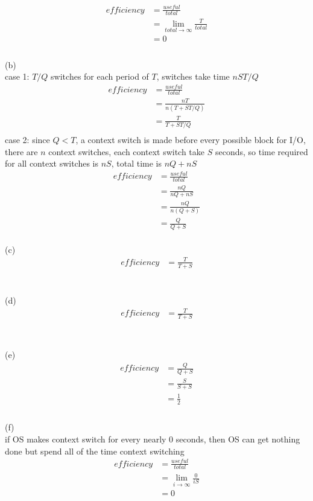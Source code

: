 \documentclass[12pt, border = 4pt, multi]{article} %
\begin{document}
\begin{align*}
efficiency &= \frac{useful}{total}\\
&= \lim_{total \rightarrow \infty} \frac{T}{total}\\
&= 0\\
\end{align*}
\\
(b)\\
case 1: $T / Q$ switches for each period of $T$, switches take time $nST / Q$
\begin{align*}
efficiency &= \frac{useful}{total}\\
&= \frac{nT}{n(T + ST / Q)}\\
&= \frac{T}{T + ST / Q}\\
\end{align*}
case 2: since $Q < T$, a context switch is made before every possible block for I/O, there are $n$ context switches, each context switch take $S$ seconds, so time required for all context switches is $nS$, total time is $nQ + nS$
\begin{align*}
efficiency &= \frac{useful}{total}\\
&= \frac{nQ}{nQ + nS}\\
&= \frac{nQ}{n(Q + S)}\\
&= \frac{Q}{Q + S}
\end{align*}
\\
(c)\\
\begin{align*}
efficiency &= \frac{T}{T + S}
\end{align*}
\\
\\
(d)
\begin{align*}
efficiency &= \frac{T}{T + S}\\
\end{align*}
\\
\\
(e)
\begin{align*}
efficiency &= \frac{Q}{Q + S}\\
&= \frac{S}{S + S}\\
&= \frac{1}{2}\\
\end{align*}
\\
(f)\\
if OS makes context switch for every nearly 0 seconds, then OS can get nothing done but spend all of the time context switching 
\begin{align*}
efficiency &= \frac{useful}{total}\\
&= \lim_{i \rightarrow \infty}\frac{0}{iS}\\
&= 0
\end{align*}
\end{document}
